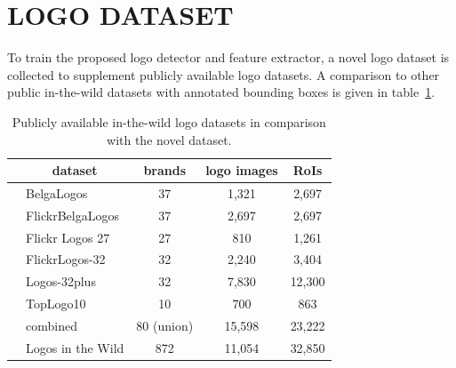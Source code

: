 \documentclass[a4paper,twoside]{article}
\newcommand{\vertboxs}[1]{\rotatebox{90}{\parbox{14mm}{\centering #1}}}
\newcommand{\vertboxt}[1]{\rotatebox{90}{\parbox{10mm}{\centering #1}}}
\begin{document}
\section{\uppercase{Logo Dataset}}
\noindent To train the proposed logo detector and feature extractor, a novel logo dataset is collected to supplement publicly available logo datasets. A comparison to other public in-the-wild datasets with annotated bounding boxes is given in table~\ref{tab:logoDatasets}.
%
\begin{table}[t]
\centering
\caption{Publicly available in-the-wild logo datasets in comparison with the novel dataset.}
\label{tab:logoDatasets}
\begin{small}
\begin{tabular}{cl|ccc}
& \multicolumn{1}{c|}{\textbf{dataset}} & \textbf{brands} & \textbf{logo images} & \textbf{RoIs} \bigstrut[b]\\
\hline
\multirow{8}{*}{\vertboxs{public}} & BelgaLogos \cite{joly2009,letessier2012} & 37 & 1,321 & 2,697 \bigstrut[t] \\
& FlickrBelgaLogos \cite{letessier2012} & 37 & 2,697 & 2,697 \\
& Flickr Logos 27 \cite{kalantidis2011} & 27 & 810 & 1,261 \\
& FlickrLogos-32 \cite{romberg2011} & 32 & 2,240 & 3,404 \\
& Logos-32plus \cite{bianco2015,bianco2017} & 32 & 7,830 & 12,300 \\
& TopLogo10 \cite{su2016} & 10 & 700 & 863 \bigstrut[b] \\
\cline{2-5}
& combined & 80 (union) & 15,598 & 23,222 \bigstrut \\
\hline
\begin{minipage}[c]{0.1cm}\vertboxt{new}\end{minipage} & Logos in the Wild & 872 & 11,054 & 32,850 \bigstrut[t]
\end{tabular}
\end{small}
\end{table}
\end{document}
